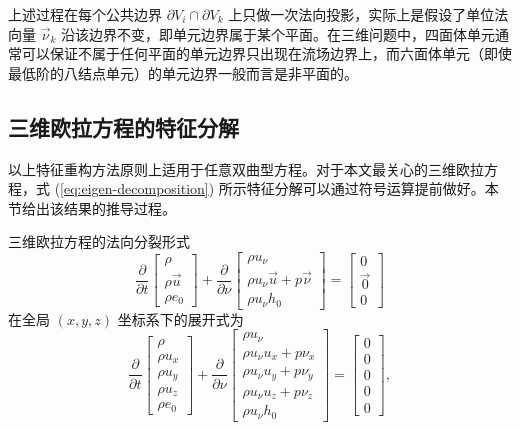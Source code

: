 上述过程在每个公共边界 $\partial V_{i}\cap\partial V_{k}$ 上只做一次法向投影，实际上是假设了单位法向量
$\vec{\nu}_{k}$ 沿该边界不变，即单元边界属于某个平面。在三维问题中，四面体单元通常可以保证不属于任何平面的单元边界只出现在流场边界上，而六面体单元（即使最低阶的八结点单元）的单元边界一般而言是非平面的。

\subsection{三维欧拉方程的特征分解}

以上特征重构方法原则上适用于任意双曲型方程。对于本文最关心的三维欧拉方程，式 (\ref{eq:eigen-decomposition})
所示特征分解可以通过符号运算提前做好。本节给出该结果的推导过程。

三维欧拉方程的法向分裂形式
\begin{equation}
\frac{\partial}{\partial t}\begin{bmatrix}\rho\\
\rho\vec{u}\\
\rho e_{0}
\end{bmatrix}+\frac{\partial}{\partial\nu}\begin{bmatrix}\rho u_{\nu}\\
\rho u_{\nu}\vec{u}+p\vec{\nu}\\
\rho u_{\nu}h_{0}
\end{bmatrix}=\begin{bmatrix}0\\
\vec{0}\\
0
\end{bmatrix}
\end{equation}
在全局 $(x,y,z)$ 坐标系下的展开式为
\begin{equation}
\frac{\partial}{\partial t}\begin{bmatrix}\rho\\
\rho u_{x}\\
\rho u_{y}\\
\rho u_{z}\\
\rho e_{0}
\end{bmatrix}+\frac{\partial}{\partial\nu}\begin{bmatrix}\rho u_{\nu}\\
\rho u_{\nu}u_{x}+p\nu_{x}\\
\rho u_{\nu}u_{y}+p\nu_{y}\\
\rho u_{\nu}u_{z}+p\nu_{z}\\
\rho u_{\nu}h_{0}
\end{bmatrix}=\begin{bmatrix}0\\
0\\
0\\
0\\
0
\end{bmatrix},
\end{equation}
